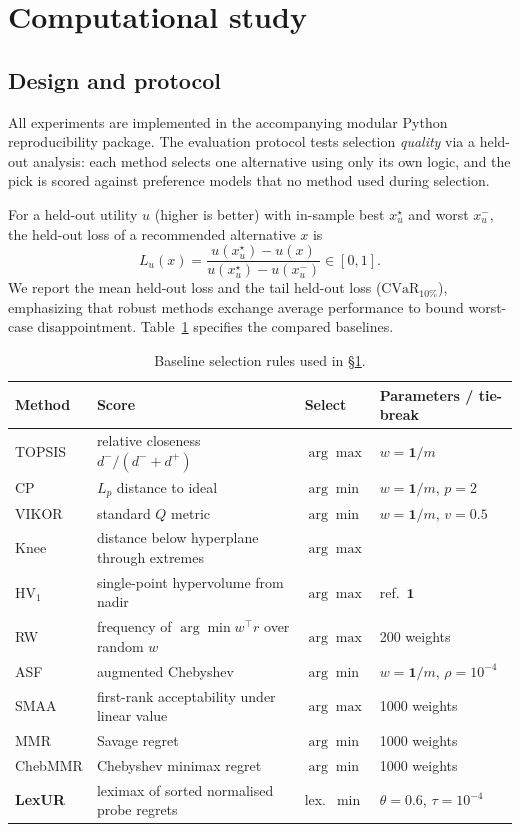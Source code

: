 \section{Computational study}
\label{sec:exp}

\subsection{Design and protocol}
All experiments are implemented in the accompanying modular Python reproducibility package. The evaluation protocol tests selection \emph{quality} via a held-out analysis: each method selects one alternative using only its own logic, and the pick is scored against preference models that no method used during selection. 

For a held-out utility $u$ (higher is better) with in-sample best $x^\star_u$ and worst $x^-_u$, the held-out loss of a recommended alternative $x$ is
\begin{equation}
L_u(x)=\frac{u(x^\star_u)-u(x)}{u(x^\star_u)-u(x^-_u)}\in[0,1].
\label{eq:heldoutloss}
\end{equation}
We report the mean held-out loss and the tail held-out loss ($\mathrm{CVaR}_{10\%}$), emphasizing that robust methods exchange average performance to bound worst-case disappointment. Table~\ref{tab:baselines} specifies the compared baselines.

\begin{table}[t]
\centering\small
\caption{Baseline selection rules used in \S\ref{sec:exp}.}
\label{tab:baselines}
\begin{tabular}{p{1.5cm}p{6.6cm}p{1.4cm}p{3.0cm}}
\toprule
Method & Score & Select & Parameters / tie-break \\
\midrule
TOPSIS & relative closeness $d^-/(d^-+d^+)$ & $\arg\max$ & $w=\mathbf 1/m$ \\
CP & $L_p$ distance to ideal & $\arg\min$ & $w=\mathbf 1/m$, $p=2$ \\
VIKOR & standard $Q$ metric & $\arg\min$ & $w=\mathbf 1/m$, $v=0.5$ \\
Knee & distance below hyperplane through extremes & $\arg\max$ &  \\
$\mathrm{HV}_1$ & single-point hypervolume from nadir & $\arg\max$ & ref.\ $\mathbf 1$ \\
RW & frequency of $\arg\min w^\top r$ over random $w$ & $\arg\max$ & 200 weights \\
ASF & augmented Chebyshev & $\arg\min$ & $w=\mathbf 1/m$, $\rho=10^{-4}$ \\
SMAA & first-rank acceptability under linear value & $\arg\max$ & 1000 weights \\
MMR & Savage regret & $\arg\min$ & 1000 weights \\
ChebMMR & Chebyshev minimax regret & $\arg\min$ & 1000 weights \\
\textbf{LexUR} & leximax of sorted normalised probe regrets & lex.\ $\min$ & $\theta=0.6$, $\tau=10^{-4}$ \\
\bottomrule
\end{tabular}
\end{table}


